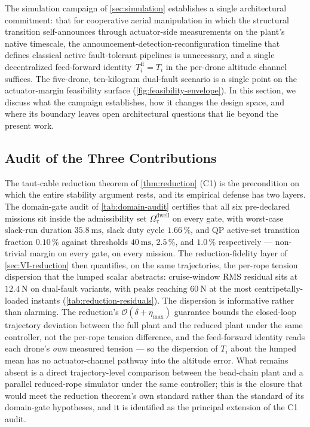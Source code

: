 The simulation campaign of \cref{sec:simulation} establishes a single architectural commitment: that for cooperative aerial manipulation in which the structural transition self-announces through actuator-side measurements on the plant's native timescale, the announcement-detection-reconfiguration timeline that defines classical active fault-tolerant pipelines is unnecessary, and a single decentralized feed-forward identity~$T_i^{\mathrm{ff}} = T_i$ in the per-drone altitude channel suffices. The five-drone, ten-kilogram dual-fault scenario is a single point on the actuator-margin feasibility surface (\cref{fig:feasibility-envelope}). In this section, we discuss what the campaign establishes, how it changes the design space, and where its boundary leaves open architectural questions that lie beyond the present work.

\subsection{Audit of the Three Contributions}
\label{sec:discussion-audit}

The taut-cable reduction theorem of \cref{thm:reduction} (C1) is the precondition on which the entire stability argument rests, and its empirical defense has two layers. The domain-gate audit of \cref{tab:domain-audit} certifies that all six pre-declared missions sit inside the admissibility set $\Omega^{\mathrm{dwell}}_{\tau}$ on every gate, with worst-case slack-run duration $\SI{35.8}{\milli\second}$, slack duty cycle $1.66\,\%$, and QP active-set transition fraction $0.10\,\%$ against thresholds $\SI{40}{\milli\second}$, $2.5\,\%$, and $1.0\,\%$ respectively --- non-trivial margin on every gate, on every mission. The reduction-fidelity layer of \cref{sec:VI-reduction} then quantifies, on the same trajectories, the per-rope tension dispersion that the lumped scalar abstracts: cruise-window RMS residual sits at $\SI{12.4}{\newton}$ on dual-fault variants, with peaks reaching $\SI{60}{\newton}$ at the most centripetally-loaded instants (\cref{tab:reduction-residuals}). The dispersion is informative rather than alarming. The reduction's $\mathcal{O}(\delta+\eta_{\max})$ guarantee bounds the closed-loop trajectory deviation between the full plant and the reduced plant under the same controller, not the per-rope tension difference, and the feed-forward identity reads each drone's \emph{own} measured tension --- so the dispersion of $T_i$ about the lumped mean has no actuator-channel pathway into the altitude error. What remains absent is a direct trajectory-level comparison between the bead-chain plant and a parallel reduced-rope simulator under the same controller; this is the closure that would meet the reduction theorem's own standard rather than the standard of its domain-gate hypotheses, and it is identified as the principal extension of the C1 audit.

